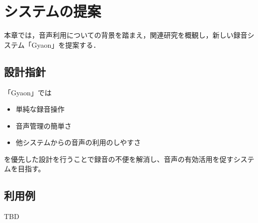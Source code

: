 \chapter{システムの提案}
\label{chap:proposal}

本章では，音声利用についての背景を踏まえ，関連研究を概観し，新しい録音システム「Gyaon」を提案する．

\newpage

\section{設計指針}

「Gyaon」では
\begin{itemize}
\item 単純な録音操作
\item 音声管理の簡単さ
\item 他システムからの音声の利用のしやすさ
\end{itemize}
を優先した設計を行うことで録音の不便を解消し、音声の有効活用を促すシステムを目指す。

\section{利用例}

TBD
